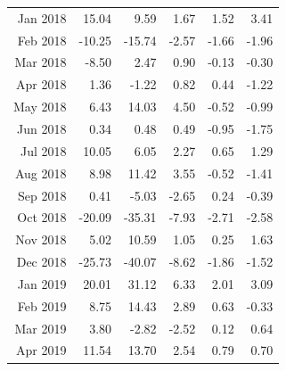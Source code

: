 \begin{tabularx}{\textwidth}{rrrrrr}
  Jan 2018 & 15.04 & 9.59 & 1.67 & 1.52 & 3.41 \\ 
  Feb 2018 & -10.25 & -15.74 & -2.57 & -1.66 & -1.96 \\ 
  Mar 2018 & -8.50 & 2.47 & 0.90 & -0.13 & -0.30 \\ 
  Apr 2018 & 1.36 & -1.22 & 0.82 & 0.44 & -1.22 \\ 
  May 2018 & 6.43 & 14.03 & 4.50 & -0.52 & -0.99 \\ 
  Jun 2018 & 0.34 & 0.48 & 0.49 & -0.95 & -1.75 \\ 
  Jul 2018 & 10.05 & 6.05 & 2.27 & 0.65 & 1.29 \\ 
  Aug 2018 & 8.98 & 11.42 & 3.55 & -0.52 & -1.41 \\ 
  Sep 2018 & 0.41 & -5.03 & -2.65 & 0.24 & -0.39 \\ 
  Oct 2018 & -20.09 & -35.31 & -7.93 & -2.71 & -2.58 \\ 
  Nov 2018 & 5.02 & 10.59 & 1.05 & 0.25 & 1.63 \\ 
  Dec 2018 & -25.73 & -40.07 & -8.62 & -1.86 & -1.52 \\ 
  Jan 2019 & 20.01 & 31.12 & 6.33 & 2.01 & 3.09 \\ 
  Feb 2019 & 8.75 & 14.43 & 2.89 & 0.63 & -0.33 \\ 
  Mar 2019 & 3.80 & -2.82 & -2.52 & 0.12 & 0.64 \\ 
  Apr 2019 & 11.54 & 13.70 & 2.54 & 0.79 & 0.70 \\ 
   \hline
\end{tabularx}
